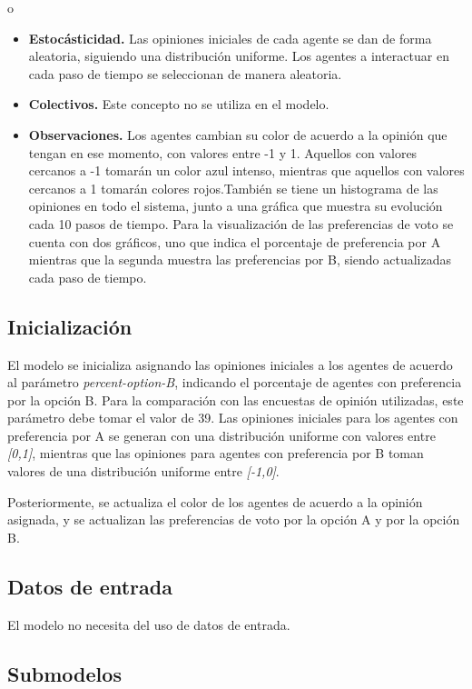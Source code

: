 o \documentclass[11pt, letterpaper]{article}
\begin{document}
\begin{itemize}
\item
  \textbf{Estocásticidad.} Las opiniones iniciales de cada agente se dan
  de forma aleatoria, siguiendo una distribución uniforme. Los agentes a
  interactuar en cada paso de tiempo se seleccionan de manera aleatoria.
\item
  \textbf{Colectivos.} Este concepto no se utiliza en el modelo.
\item
  \textbf{Observaciones.} Los agentes cambian su color de acuerdo a la
  opinión que tengan en ese momento, con valores entre -1 y 1. Aquellos
  con valores cercanos a -1 tomarán un color azul intenso, mientras que
  aquellos con valores cercanos a 1 tomarán colores rojos.También se
  tiene un histograma de las opiniones en todo el sistema, junto a una
  gráfica que muestra su evolución cada 10 pasos de tiempo. Para la
  visualización de las preferencias de voto se cuenta con dos gráficos,
  uno que indica el porcentaje de preferencia por A mientras que la
  segunda muestra las preferencias por B, siendo actualizadas cada paso
  de tiempo.
\end{itemize}

\subsection{Inicialización}\label{inicializaciuxf3n}

El modelo se inicializa asignando las opiniones iniciales a los agentes
de acuerdo al parámetro \emph{percent-option-B}, indicando el porcentaje
de agentes con preferencia por la opción B. Para la comparación con las
encuestas de opinión utilizadas, este parámetro debe tomar el valor de
39. Las opiniones iniciales para los agentes con preferencia por A se
generan con una distribución uniforme con valores entre
\emph{{[}0,1{]}}, mientras que las opiniones para agentes con
preferencia por B toman valores de una distribución uniforme entre
\emph{{[}-1,0{]}}.

Posteriormente, se actualiza el color de los agentes de acuerdo a la
opinión asignada, y se actualizan las preferencias de voto por la opción
A y por la opción B.

\subsection{Datos de entrada}\label{datos-de-entrada}

El modelo no necesita del uso de datos de entrada.

\subsection{Submodelos}\label{submodelos}
\end{document}
